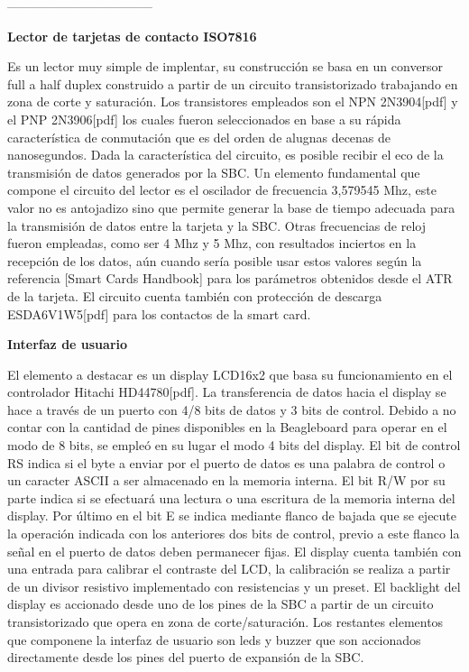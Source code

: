 \bigskip
-----------------------------------
\bigskip

{\bf{Lector de tarjetas de contacto ISO7816}}

Es un lector muy simple de implentar, su construcción se basa en un conversor full a half duplex construido a partir de un circuito transistorizado trabajando en zona de corte y saturación. Los transistores empleados son el NPN 2N3904[pdf] y el PNP 2N3906[pdf] los cuales fueron seleccionados en base a su rápida característica de conmutación que es del orden de alugnas decenas de nanosegundos. Dada la característica del circuito, es posible recibir el eco de la transmisión de datos generados por la SBC. 
Un elemento fundamental que compone el circuito del lector es el oscilador de frecuencia 3,579545 Mhz, este valor no es antojadizo sino que permite generar la base de tiempo adecuada para la transmisión de datos entre la tarjeta y la SBC. Otras frecuencias de reloj fueron empleadas, como ser 4 Mhz y 5 Mhz, con resultados inciertos en la recepción de los datos, aún cuando sería posible usar estos valores según la referencia [Smart Cards Handbook] para los parámetros obtenidos desde el ATR de la tarjeta. 
El circuito cuenta también con protección de descarga ESDA6V1W5[pdf] para los contactos de la smart card.

\bigskip
\bigskip
{\bf{Interfaz de usuario}}

El elemento a destacar es un display LCD16x2 que basa su funcionamiento en el controlador Hitachi HD44780[pdf]. La transferencia de datos hacia el display se hace a través de un puerto con 4/8 bits de datos y 3 bits de control. Debido a no contar con la cantidad de pines disponibles en la Beagleboard para operar en el modo de 8 bits, se empleó en su lugar el modo 4 bits del display. El bit de control RS indica si el byte a enviar por el puerto de datos es una palabra de control o un caracter ASCII a ser almacenado en la memoria interna. El bit R/W por su parte indica si se efectuará una lectura o una escritura de la memoria interna del display. Por último en el bit E se indica mediante flanco de bajada que se ejecute la operación indicada con los anteriores dos bits de control, previo a este flanco la señal en el puerto de datos deben permanecer fijas.
El display cuenta también con una entrada para calibrar el contraste del LCD, la calibración se realiza a partir de un divisor resistivo implementado con resistencias y un preset.
El backlight del display es accionado desde uno de los pines de la SBC a partir de un circuito transistorizado que opera en zona de corte/saturación.
Los restantes elementos que componene la interfaz de usuario son leds y buzzer que son accionados directamente desde los pines del puerto de expansión de la SBC.

